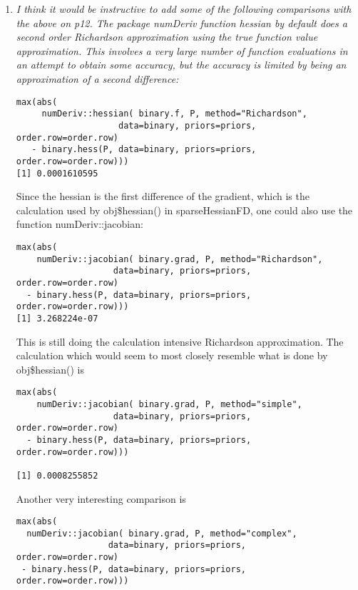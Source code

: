 \documentclass{article}
\newenvironment{revQuote}{\itshape}{\vspace{\baselineskip}}
\newenvironment{response}{\normalfont}{\vspace{\baselineskip}}
\begin{document}
\begin{enumerate}
\begin{response}
  
\end{response}


\item \begin{revQuote}
I think it would be instructive to add some of the following comparisons
with the above on p12.  The package numDeriv function hessian by default
does a second order Richardson approximation using the true function value
approximation. This involves a very large number of function evaluations in
an attempt to obtain some accuracy, but the accuracy is limited by being an
approximation of a second difference:
\begin{verbatim}
max(abs(
     numDeriv::hessian( binary.f, P, method="Richardson", 
                    data=binary, priors=priors,
order.row=order.row) 
   - binary.hess(P, data=binary, priors=priors, order.row=order.row)))
[1] 0.0001610595

\end{verbatim}

Since the hessian is the first difference of the gradient, which is the
calculation used by obj\$hessian() in sparseHessianFD, one could also use the
function numDeriv::jacobian:

\begin{verbatim}
max(abs( 
    numDeriv::jacobian( binary.grad, P, method="Richardson", 
                   data=binary, priors=priors,
order.row=order.row)
  - binary.hess(P, data=binary, priors=priors, order.row=order.row)))
[1] 3.268224e-07
\end{verbatim}

This is still doing the calculation intensive Richardson approximation. The
calculation which would seem to most closely resemble what is done by
obj\$hessian() is

\begin{verbatim}
max(abs( 
    numDeriv::jacobian( binary.grad, P, method="simple", 
                   data=binary, priors=priors,
order.row=order.row)
  - binary.hess(P, data=binary, priors=priors, order.row=order.row)))

[1] 0.0008255852

\end{verbatim}


Another very interesting comparison is

\begin{verbatim}
max(abs( 
  numDeriv::jacobian( binary.grad, P, method="complex", 
                  data=binary, priors=priors,
order.row=order.row)
 - binary.hess(P, data=binary, priors=priors, order.row=order.row)))


\end{verbatim}
\end{revQuote}
\end{enumerate}
\end{document}
